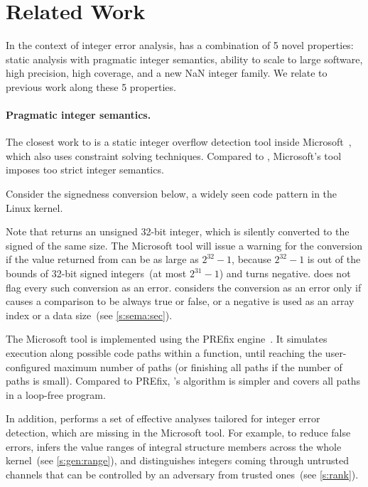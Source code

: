 \section{Related Work}
\label{s:relwk}

In the context of integer error analysis, \sys has a combination of 5 novel
properties: static analysis with pragmatic integer semantics, ability to scale
to large software, high precision, high coverage, and a new NaN integer family.
We relate \sys to previous work along these 5 properties.

\paragraph{Pragmatic integer semantics.} The closest work to \sys is a static integer overflow detection
tool inside Microsoft~\cite{moy:z3prefix}, which also uses constraint solving
techniques.  Compared to \sys, Microsoft's tool imposes too strict integer
semantics.

Consider the signedness conversion below, a widely seen code pattern in
the Linux kernel.

Note that  returns an unsigned 32-bit integer, which
is silently converted to the signed  of the same size.
The Microsoft tool will issue a warning for the conversion if
the value returned from  can be as large as $2^{32}
- 1$, because $2^{32} - 1$ is out of the bounds of 32-bit signed
integers~(at most $2^{31} - 1$) and turns  negative.
%
\sys does not flag every such conversion as an error.  \sys considers
the conversion as an error only if  causes a comparison
to be always true or false, or a negative  is used as
an array index or a data size~(see \autoref{s:sema:sec}).

The Microsoft tool is implemented using the PREfix
engine~\cite{bush:prefix}.  It simulates execution along possible
code paths within a function, until reaching
the user-configured maximum number of paths (or finishing all paths
if the number of paths is small).
%
Compared to PREfix, \sys's algorithm is simpler
and covers all paths in a loop-free program.
\fi

In addition, \sys performs a set of effective analyses
tailored for integer error detection, which are missing in the
Microsoft tool.  For example, to reduce false errors, \sys infers
the value ranges of integral structure members across the whole
kernel~(see \autoref{s:gen:range}), and distinguishes integers coming
through untrusted channels that can be controlled by an adversary
from trusted ones~(see \autoref{s:rank}).

